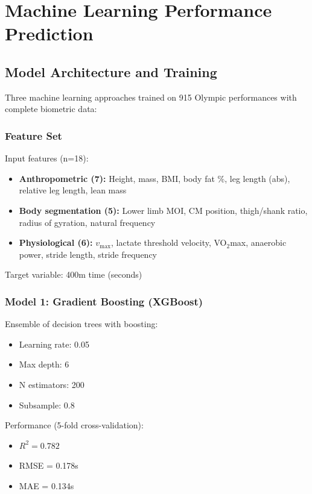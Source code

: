 \section{Machine Learning Performance Prediction}

\subsection{Model Architecture and Training}

Three machine learning approaches trained on 915 Olympic performances with complete biometric data:

\subsubsection{Feature Set}

Input features (n=18):
\begin{itemize}
    \item \textbf{Anthropometric (7):} Height, mass, BMI, body fat \%, leg length (abs), relative leg length, lean mass
    \item \textbf{Body segmentation (5):} Lower limb MOI, CM position, thigh/shank ratio, radius of gyration, natural frequency
    \item \textbf{Physiological (6):} $v_{\max}$, lactate threshold velocity, VO$_2$max, anaerobic power, stride length, stride frequency
\end{itemize}

Target variable: 400m time (seconds)

\subsubsection{Model 1: Gradient Boosting (XGBoost)}

Ensemble of decision trees with boosting:
\begin{itemize}
    \item Learning rate: 0.05
    \item Max depth: 6
    \item N estimators: 200
    \item Subsample: 0.8
\end{itemize}

Performance (5-fold cross-validation):
\begin{itemize}
    \item $R^2 = 0.782$
    \item RMSE = 0.178s
    \item MAE = 0.134s
\end{itemize}

